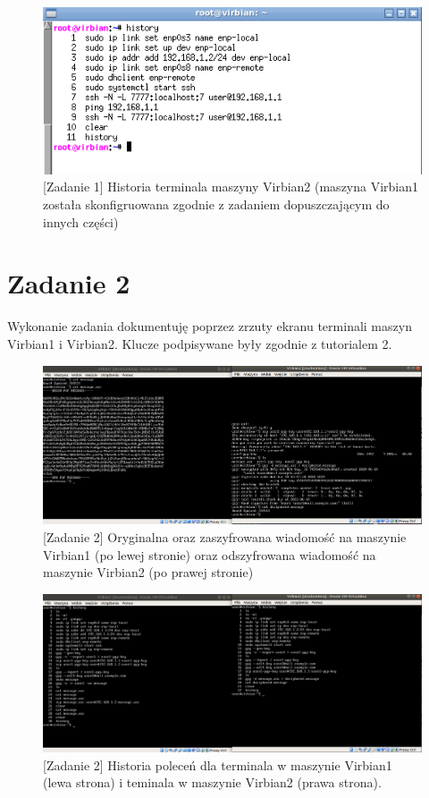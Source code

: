 \documentclass[a4paper]{scrartcl}
\begin{document}
\begin{figure}
  \includegraphics[width=\linewidth]{zad1_hist.png}
  \caption{[Zadanie 1] Historia terminala maszyny Virbian2 (maszyna Virbian1 została skonfigruowana zgodnie z zadaniem dopuszczającym do innych części)}
\end{figure}
\section{Zadanie 2}
Wykonanie zadania dokumentuję poprzez zrzuty ekranu terminali maszyn Virbian1 i Virbian2. Klucze podpisywane były zgodnie z tutorialem 2.
\begin{figure}
  \includegraphics[width=\linewidth]{message.png}
  \caption{[Zadanie 2] Oryginalna oraz zaszyfrowana wiadomość na maszynie Virbian1 (po lewej stronie) oraz odszyfrowana wiadomość na maszynie Virbian2 (po prawej stronie)}
\end{figure}
\begin{figure}
  \includegraphics[width=\linewidth]{history.png}
  \caption{[Zadanie 2] Historia poleceń dla terminala w maszynie Virbian1 (lewa strona) i teminala w maszynie Virbian2 (prawa strona).}
\end{figure}
\end{document}
